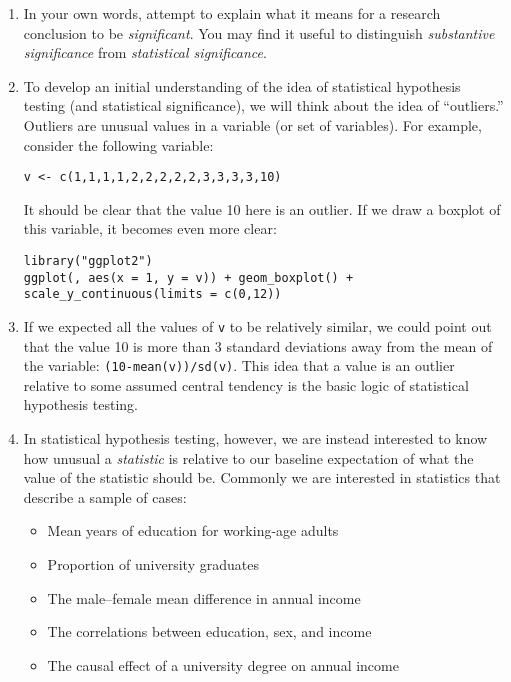 \documentclass[a4paper,12pt]{article}
\begin{document}
\begin{enumerate}

\item In your own words, attempt to explain what it means for a research conclusion to be \textit{significant}. You may find it useful to distinguish \textit{substantive significance} from \textit{statistical significance}.

\vspace{4em}

\item To develop an initial understanding of the idea of statistical hypothesis testing (and statistical significance), we will think about the idea of ``outliers.'' Outliers are unusual values in a variable (or set of variables). For example, consider the following variable:

\begin{verbatim}
v <- c(1,1,1,1,2,2,2,2,2,3,3,3,3,10)
\end{verbatim}

\noindent It should be clear that the value 10 here is an outlier. If we draw a boxplot of this variable, it becomes even more clear:

\begin{verbatim}
library("ggplot2")
ggplot(, aes(x = 1, y = v)) + geom_boxplot() + scale_y_continuous(limits = c(0,12))
\end{verbatim}

\item If we expected all the values of \texttt{v} to be relatively similar, we could point out that the value 10 is more than 3 standard deviations away from the mean of the variable: \texttt{(10-mean(v))/sd(v)}. This idea that a value is an outlier relative to some assumed central tendency is the basic logic of statistical hypothesis testing.

\item In statistical hypothesis testing, however, we are instead interested to know how unusual a \textit{statistic} is relative to our baseline expectation of what the value of the statistic should be. Commonly we are interested in statistics that describe a sample of cases:

\begin{itemize}
\item Mean years of education for working-age adults
\item Proportion of university graduates
\item The male--female mean difference in annual income
\item The correlations between education, sex, and income
\item The causal effect of a university degree on annual income
\end{itemize}


\end{enumerate}
\end{document}
